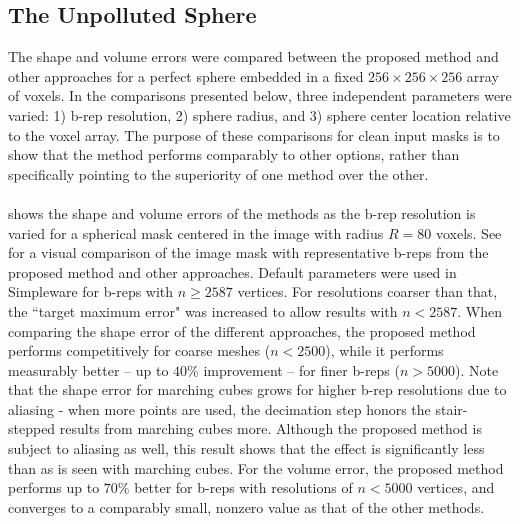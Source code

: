 \subsection{{The Unpolluted Sphere}}
\label{The Unpolluted Sphere}

The shape and volume errors were compared between {the proposed method and other approaches} for a perfect sphere embedded in a fixed $256 \times 256 \times 256$ array of voxels.  In the comparisons presented below, three independent parameters were varied:  1) b-rep resolution, 2) sphere radius, and 3) sphere center location relative to the voxel array. The purpose of these comparisons for clean input masks is to show that the method performs comparably to other options, rather than specifically pointing to the superiority of one method over the other. \\ \\
%
 shows the shape and volume errors of the methods as the b-rep resolution is varied for a spherical mask centered in the image with radius $R = 80$ voxels. See~ for a visual comparison of the image mask with representative b-reps from {the proposed method and other approaches}. Default parameters were used in Simpleware for b-reps with $n \ge 2587$ vertices. For resolutions coarser than that, the ``target maximum error" was increased to allow results with $n < 2587$. When comparing the shape error of the different approaches, the proposed method performs competitively for coarse meshes ($n < 2500$), while it performs measurably better -- up to $40\%$ improvement -- for finer b-reps ($n > 5000$). {Note that the shape error for marching cubes grows for higher b-rep resolutions due to aliasing - when more points are used, the decimation step honors the stair-stepped results from marching cubes more. Although the proposed method is subject to aliasing as well, this result shows that the effect is significantly less than as is seen with marching cubes.} For the volume error, the proposed method performs up to $70\%$ better for b-reps with resolutions of $n < 5000$ vertices, and converges to a comparably small, nonzero value as that of {the other methods.} \\
